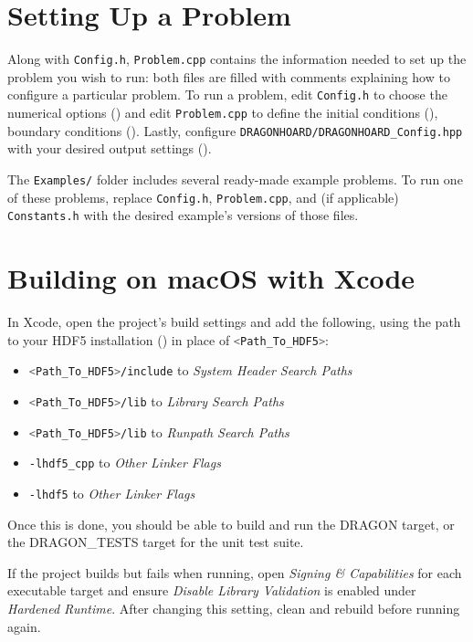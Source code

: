 \documentclass[11pt]{report}
\newcommand{\bash}[1]{\lstinline[language=bash]{#1}}
\begin{document}
\section{Setting Up a Problem}
\label{sec:usage-problem}

Along with \bash{Config.h}, \bash{Problem.cpp} contains the information needed to set up the problem you wish to run: both files are filled with comments explaining how to configure a particular problem. To run a problem, edit \bash{Config.h} to choose the numerical options () and edit \bash{Problem.cpp} to define the initial conditions (), boundary conditions (). Lastly, configure \bash{DRAGONHOARD/DRAGONHOARD_Config.hpp} with your desired output settings ().


The \bash{Examples/} folder includes several ready-made example problems. To run one of these problems, replace \bash{Config.h}, \bash{Problem.cpp}, and (if applicable) \bash{Constants.h} with the desired example's versions of those files. 

\section{Building on macOS with Xcode}
\label{sec:usage-xcode}

In Xcode, open the project's build settings and add the following, using the path to your HDF5 installation () in place of \bash{<Path_To_HDF5>}:
\begin{itemize}
\item \bash{<Path_To_HDF5>/include} to \emph{System Header Search Paths}
\item \bash{<Path_To_HDF5>/lib} to \emph{Library Search Paths}
\item \bash{<Path_To_HDF5>/lib} to \emph{Runpath Search Paths}
\item \bash{-lhdf5_cpp} to \emph{Other Linker Flags}
\item \bash{-lhdf5} to \emph{Other Linker Flags}
\end{itemize}
Once this is done, you should be able to build and run the DRAGON target, or the DRAGON\_TESTS target for the unit test suite.

If the project builds but fails when running, open \emph{Signing \& Capabilities} for each executable target and ensure \emph{Disable Library Validation} is enabled under \emph{Hardened Runtime}. After changing this setting, clean and rebuild before running again.
\end{document}

